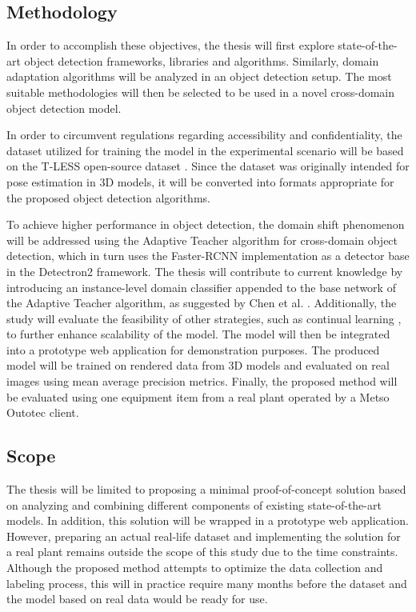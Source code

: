 \subsection{Methodology}
In order to accomplish these objectives, the thesis will first explore state-of-the-art object detection frameworks, libraries and algorithms. Similarly, domain adaptation algorithms will be analyzed in an object detection setup. The most suitable methodologies will then be selected to be used in a novel cross-domain object detection model.  

In order to circumvent regulations regarding accessibility and confidentiality, the dataset utilized for training the model in the experimental scenario will be based on the T-LESS open-source dataset \cite{hodan2017tless}. Since the dataset was originally intended for pose estimation in 3D models, it will be converted into formats appropriate for the proposed object detection algorithms.

To achieve higher performance in object detection, the domain shift phenomenon will be addressed using the Adaptive Teacher \cite{Li2021} algorithm for cross-domain object detection, which in turn uses the Faster-RCNN \cite{ima} implementation as a detector base in the Detectron2 \cite{wu2019Detectron2} framework.  The thesis will contribute to current knowledge by introducing an instance-level domain classifier appended to the base network of the Adaptive Teacher algorithm, as suggested by Chen et al. \cite{Chen2018}. Additionally, the study will evaluate the feasibility of other strategies, such as continual learning \cite{Parisi2018}, to further enhance scalability of the model. The model will then be integrated into a prototype web application for demonstration purposes. The produced model will be trained on rendered data from 3D models and evaluated on real images using mean average precision metrics. Finally, the proposed method will be evaluated using one equipment item from a real plant operated by a Metso Outotec client.

\clearpage

\subsection{Scope}

The thesis will be limited to proposing a minimal proof-of-concept solution based on analyzing and combining different components of existing state-of-the-art models. In addition, this solution will be wrapped in a prototype web application. However, preparing an actual real-life dataset and implementing the solution for a real plant remains outside the scope of this study due to the time constraints. Although the proposed method attempts to optimize the data collection and labeling process, this will in practice require many months before the dataset and the model based on real data would be ready for use. 

